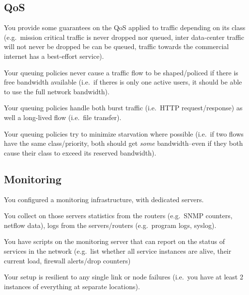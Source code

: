 \documentclass[a4paper,12pt]{article}
\begin{document}
\subsection{QoS}
\begin{checklist}
    \item You provide some guarantees on the QoS applied to traffic depending
        on its class (e.g.\ mission critical traffic is never dropped nor
        queued, inter data-center traffic will not never be dropped be can be
        queued, traffic towards the commercial internet has a best-effort
        service).
    \item Your queuing policies never cause a traffic flow to be shaped/policed
        if there is free bandwidth available (i.e.\ if theres is only one active
        users, it should be able to use the full network bandwidth).
    \item Your queuing policies handle both burst traffic (i.e.\ HTTP
        request/response) as well a long-lived flow (i.e.\ file transfer).
    \item Your queuing policies try to minimize starvation where possible
        (i.e.\ if two flows have the same class/priority, both should get
        \emph{some} bandwidth--even if they both cause their class to exceed
        its reserved bandwidth).
\end{checklist}

\subsection{Monitoring}
\begin{checklist}
    \item You configured a monitoring infrastructure, with dedicated servers.
    \item You collect on those servers statistics from the routers (e.g.\ SNMP
        counters, netflow data), logs from the servers/routers (e.g.\ program
        logs, syslog).
    \item You have scripts on the monitoring server that can report on the
        status of services in the network (e.g.\ list whether all service
        instances are alive, their current load, firewall alerts/drop counters)
    \item Your setup is resilient to any single link or node failures (i.e.\
        you have at least 2 instances of everything at separate locations).
\end{checklist}
\end{document}
